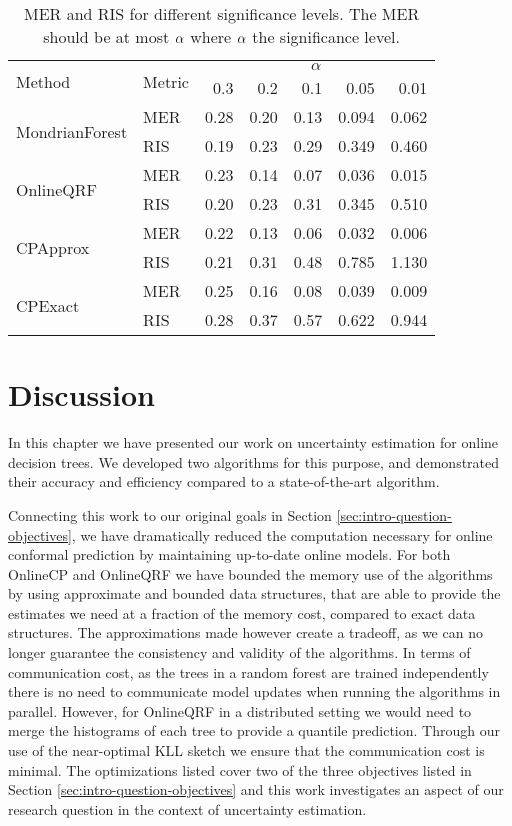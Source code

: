 \begin{table}
	\centering
	\begin{tabular}{ll r r r r r}
		\toprule
		\multirow{2}{*}{Method} &  \multirow{2}{*}{Metric} &  \multicolumn{5}{c}{$\alpha$} \\
		\cmidrule(lr){3-7}
		& & 0.3 &   0.2 &   0.1 &   0.05 &   0.01 \\
		\midrule
		\multirow{2}{*}{MondrianForest}   & MER  & 0.28 & 0.20 & 0.13 &  0.094 &  0.062 \\
		& RIS  &  0.19 &  0.23 &  0.29 &   0.349 &   0.460 \\
		\midrule
		\multirow{2}{*}{OnlineQRF} & MER & 0.23 & 0.14 & 0.07 &  0.036 &  0.015 \\
		& RIS &  0.20 &  0.23 &  0.31 &   0.345 &   0.510 \\
		\midrule
		\multirow{2}{*}{CPApprox} & MER  & 0.22 & 0.13 & 0.06 &  0.032 &  0.006 \\
		& RIS &   0.21 &   0.31 &   0.48 &   0.785 &    1.130 \\
		\midrule
		\multirow{2}{*}{CPExact} & MER  & 0.25 & 0.16 & 0.08 &  0.039 &  0.009 \\
		& RIS &   0.28 &   0.37 &   0.57 &   0.622 &   0.944 \\
		\bottomrule
	\end{tabular}
	\caption{MER and RIS for different significance levels. The MER should be at most
		$\alpha$ where $\alpha$ the significance level.}
	\label{tab:uncertain-significance}
\end{table}

\section{Discussion}
\label{sec:uncertain-trees-discussion}

In this chapter we have presented our work on uncertainty estimation for
online decision trees. We developed two algorithms for this purpose,
and demonstrated their accuracy and efficiency compared to a state-of-the-art algorithm.

Connecting this work to our original goals in Section \ref{sec:intro-question-objectives},
we have dramatically reduced the computation necessary for online conformal
prediction by maintaining up-to-date online models. For both OnlineCP and
OnlineQRF we have bounded the memory use of the algorithms by using approximate
and bounded data structures, that are able to provide the estimates we need
at a fraction of the memory cost, compared to exact data structures.
The approximations made however create a tradeoff,
as we can no longer guarantee the consistency and validity of the algorithms.
In terms of communication cost, as the trees in a random forest are trained independently there is no
need to communicate model updates when running the algorithms in parallel.
However, for OnlineQRF in a distributed setting we would need to merge the histograms of each tree to provide
a quantile prediction. Through our use of the near-optimal KLL sketch we ensure
that the communication cost is minimal.
The optimizations listed cover two of the three objectives
listed in Section \ref{sec:intro-question-objectives} and this work investigates
an aspect of our research question in the context of uncertainty estimation.